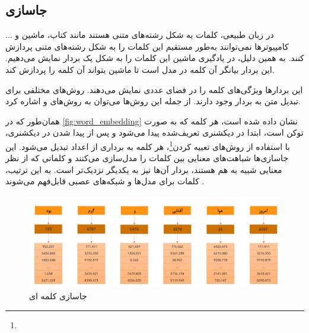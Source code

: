 \subsection{جاسازی}
در زبان طبیعی، کلمات به شکل رشته‌های متنی هستند مانند کتاب، ماشین و ... کامپیوترها نمی‌توانند به‌طور مستقیم این کلمات را به شکل رشته‌های متنی پردازش کنند. به همین دلیل، در یادگیری ماشین این کلمات را به شکل یک بردار نمایش می‌دهیم. این بردار بیانگر آن کلمه در مدل است تا ماشین بتواند آن کلمه را پردازش کند.

این بردارها ویژگی‌های کلمه را در فضای عددی نمایش می‌دهند. روش‌های مختلفی برای تبدیل متن به بردار وجود دارند. از جمله این روش‌ها می‌توان به روش‌های  \cite{mikolov2013distributed} و  \cite{pennington2014glove} اشاره کرد.

همان‌طور که در \autoref{fig:word_embedding} نشان داده شده است، هر کلمه که به صورت توکن است، ابتدا در دیکشنری تعریف‌شده پیدا می‌شود و پس از پیدا شدن در دیکشنری، با استفاده از روش‌های تعبیه کردن\footnote{}، هر کلمه به برداری از اعداد تبدیل می‌شود. این جاسازی‌ها شباهت‌های معنایی بین کلمات را مدل‌سازی می‌کنند و کلماتی که از نظر معنایی شبیه به هم هستند، بردار آن‌ها نیز به یکدیگر نزدیک‌تر است. به این ترتیب، کلمات برای مدل‌ها و شبکه‌های عصبی قابل‌فهم می‌شوند \cite{mikolov2013distributed,pennington2014glove}.





 \begin{figure}[h]
 	\centering
 	\begin{minipage}[b]{0.7\textwidth}
 		\centering
 		\includegraphics[width=\textwidth]{transformer_images/persian images/persian_images/b16.png}
 		\caption{جاسازی کلمه ای}
 		\label{fig:word_embedding}
 	\end{minipage}
 	\hfill
 \end{figure}
 
 
 

 
 
 
 



